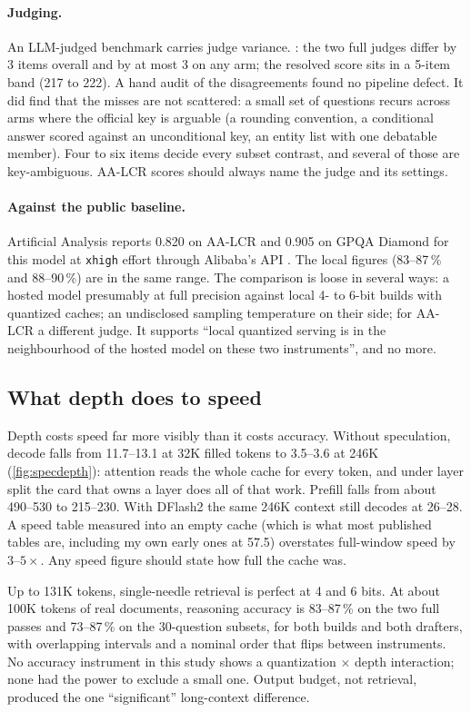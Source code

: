 \paragraph{Judging.} An LLM-judged benchmark carries judge variance. : the two full
judges differ by 3 items overall and by at most 3 on any arm; the resolved score sits in a 5-item band
(217 to 222). A hand audit of the disagreements found no pipeline defect. It did find that the misses
are not scattered: a small set of questions recurs across arms where the official key is arguable
(a rounding convention, a conditional answer scored against an unconditional key, an entity list with
one debatable member). Four to six items decide every subset contrast, and several of those are
key-ambiguous. AA-LCR scores should always name the judge and its settings.

\paragraph{Against the public baseline.} Artificial Analysis reports 0.820 on AA-LCR and 0.905 on GPQA
Diamond for this model at \texttt{xhigh} effort through Alibaba's API
\citep{artificialanalysis2026qwen38}. The local figures (83--87\,\% and 88--90\,\%) are in the same
range. The comparison is loose in several ways: a hosted model presumably at full precision against
local 4- to 6-bit builds with quantized caches; an undisclosed sampling temperature on their side;
for AA-LCR a different judge. It supports ``local quantized serving is in the neighbourhood of the
hosted model on these two instruments'', and no more.

\subsection{What depth does to speed}
Depth costs speed far more visibly than it costs accuracy. Without speculation, decode falls from
11.7--13.1\tps{} at 32K filled tokens to 3.5--3.6 at 246K (\cref{fig:specdepth}): attention reads the
whole cache for every token, and under layer split the card that owns a layer does all of that work.
Prefill falls from about 490--530\tps{} to 215--230. With DFlash2 the same 246K context still decodes
at 26--28\tps. A speed table measured into an empty cache (which is what most published tables are,
including my own early ones at 57.5\tps{}) overstates full-window speed by $3$--$5\times$. Any speed
figure should state how full the cache was.

\begin{takeaway}
Up to 131K tokens, single-needle retrieval is perfect at 4 and 6 bits. At about 100K tokens of real
documents, reasoning accuracy is 83--87\,\% on the two full passes and 73--87\,\% on the 30-question
subsets, for both builds and both drafters, with overlapping intervals and a nominal order that flips between instruments. No accuracy instrument in this study
shows a quantization $\times$ depth interaction; none had the power to exclude a small one. Output
budget, not retrieval, produced the one ``significant'' long-context difference.
\end{takeaway}
